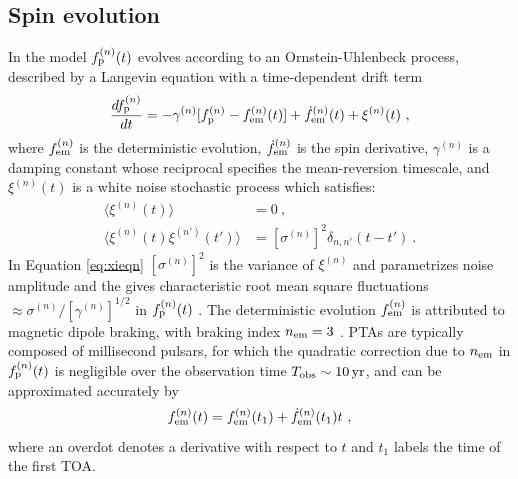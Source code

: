\documentclass[fleqn,usenatbib,useAMS]{mnras}
\begin{document}
\subsection{Spin evolution} \label{sec:psr_frequency}
In the model $f_{\rm p}^{(n)}(t)$ evolves according to an Ornstein-Uhlenbeck process, described by a Langevin equation with a time-dependent drift term \citep{Vargas}
\begin{equation}
	\frac{df_{\rm p}^{(n)}}{dt} = -\gamma^{(n)}	 [f_{\rm p}^{(n)} - f_{\rm em}^{(n)} (t)] + \dot{f}_{\rm em}^{(n)}(t) +\xi^{(n)}(t) \ ,
	\label{eq:frequency_evolution}
\end{equation}
where $f_{\rm em}^{(n)}$ is the deterministic evolution, $\dot{f}_{\rm em}^{(n)}$ is the spin derivative, $\gamma^{(n)}$ is a damping constant whose reciprocal specifies the mean-reversion timescale, and $\xi^{(n)}(t)$ is a white noise stochastic process which satisfies:
\begin{align}
	\langle \xi^{(n)}(t) \rangle &= 0 \ , \\
	\langle \xi^{(n)}(t) \xi^{(n')}(t') \rangle &= [\sigma^{(n)}]^2 \delta_{n,n'}(t - t') \ .	\label{eq:xieqn}
\end{align}
In Equation \eqref{eq:xieqn} $[\sigma^{(n)}]^2$ is the variance of $\xi^{(n)}$ and parametrizes noise amplitude and the gives characteristic root mean square fluctuations $\approx \sigma^{(n)} / [\gamma^{(n)}]^{1/2}$ in $f_{\rm p}^{(n)}(t)$ \citep{gardiner2009stochastic}. The deterministic evolution $f_{\rm em}^{(n)}$ is attributed to magnetic dipole braking, with braking index $n_{\rm em}=3$ \citep{1969ApJ...157..869G}. PTAs are typically composed of millisecond pulsars, for which the quadratic correction due to $n_{\rm em}$ in $f_{\rm p}^{(n)}(t)$ is negligible over the observation time $T_{\rm obs} \sim 10 \, {\rm yr}$, and can be approximated accurately by 
\begin{equation}
	f_{\rm em}^{(n)}(t) = f_{\rm em}^{(n)}(t_1) + \dot{f}_{\rm em}^{(n)}(t_1)t \ , \label{eq:spinevol}
\end{equation} 
where an overdot denotes a derivative with respect to $t$ and $t_1$ labels the time of the first TOA. \newline 
\end{document}
